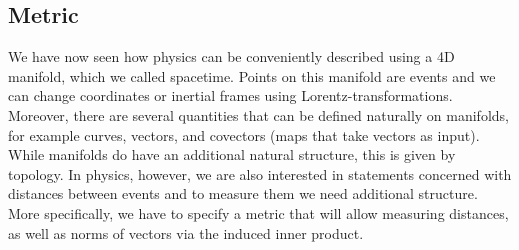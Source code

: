 		\subsection{Metric}
We have now seen how physics can be conveniently described using a 4D manifold, which we called spacetime. Points on this manifold are events and we can change coordinates or inertial frames using Lorentz-transformations. Moreover, there are several quantities that can be defined naturally on manifolds, for example curves, vectors, and covectors (maps that take vectors as input). While manifolds do have an additional natural structure, this is given by topology. In physics, however, we are also interested in statements concerned with distances between events and to measure them we need additional structure. More specifically, we have to specify a metric that will allow measuring distances, as well as norms of vectors via the induced inner product.


